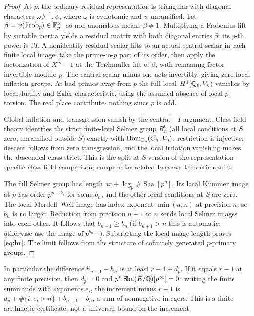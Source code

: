 \documentclass[11pt,a4paper]{article}
\theoremstyle{definition}\newtheorem{definition}[theorem]{Definition}
\theoremstyle{remark}\newtheorem{remark}[theorem]{Remark}
\newcommand{\Sha}{\operatorname{\mathrm{Sha}}}
\numberwithin{equation}{section}
\begin{document}
\begin{proof}
At $p$, the ordinary residual representation is triangular with diagonal characters $\omega\psi^{-1},\psi$, where $\omega$ is cyclotomic and $\psi$ unramified. Let $\beta=\psi(\mathrm{Frob}_p)\in\mathbb F_p^\times$, so non-anomalous means $\beta\ne1$. Multiplying a Frobenius lift by suitable inertia yields a residual matrix with both diagonal entries $\beta$; its $p$-th power is $\beta I$. A nonidentity residual scalar lifts to an actual central scalar in each finite local image: take the prime-to-$p$ part of its order, then apply the factorization of $X^m-1$ at the Teichm\"uller lift of $\beta$, with remaining factor invertible modulo $p$. The central scalar minus one acts invertibly, giving zero local inflation groups. At bad primes away from $p$ the full local $H^1(\mathbb Q_\ell,V_n)$ vanishes by local duality and Euler characteristic, using the assumed absence of local $p$-torsion. The real place contributes nothing since $p$ is odd.

Global inflation and transgression vanish by the central $-I$ argument. Class-field theory identifies the strict finite-level Selmer group $R_n^0$ (all local conditions at $S$ zero, unramified outside $S$) exactly with $\operatorname{Hom}_{\Gamma_n}(C_n,V_n)$: restriction is injective; descent follows from zero transgression, and the local inflation vanishing makes the descended class strict. This is the split-at-$S$ version of the representation-specific class-field comparison; compare \cite{HO} for related Iwasawa-theoretic results.

The full Selmer group has length $nr+\log_p\#\Sha[p^n]$. Its local Kummer image at $p$ has order $p^{n-b_n}$ for some $b_n$, and the other local conditions at $S$ are zero. The local Mordell--Weil image has index exponent $\min(a,n)$ at precision $n$, so $b_n$ is no larger. Reduction from precision $n+1$ to $n$ sends local Selmer images into each other. It follows that $b_{n+1}\geq b_n$ (if $b_{n+1}>n$ this is automatic; otherwise use the image of $p^{b_{n+1}}$). Subtracting the local image length proves \eqref{eq:hn}. The limit follows from the structure of cofinitely generated $p$-primary groups.
\end{proof}
In particular the difference $h_{n+1}-h_n$ is at least $r-1+d_p$. If it equals $r-1$ at any finite precision, then $d_p=0$ and $p^n\Sha(E/\QQ)[p^\infty]=0$: writing the finite summands with exponents $e_i$, the increment minus $r-1$ is $d_p+\#\{i:e_i>n\}+b_{n+1}-b_n$, a sum of nonnegative integers. This is a finite arithmetic certificate, not a universal bound on the increment.
\end{document}
